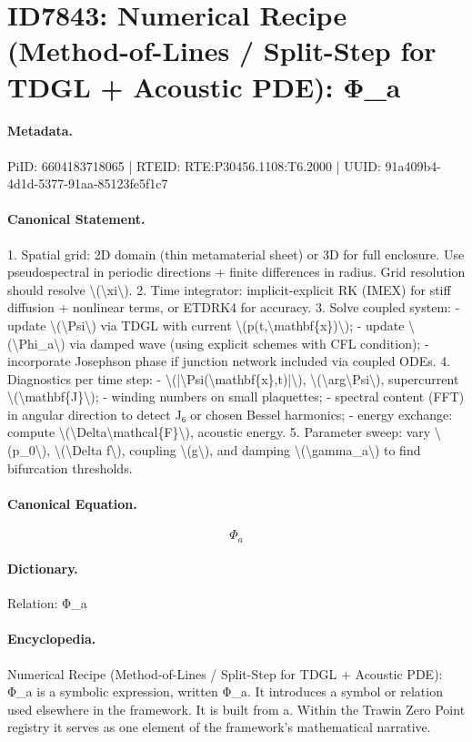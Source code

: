 \section*{ID7843: Numerical Recipe (Method-of-Lines / Split-Step for TDGL + Acoustic PDE): Φ\_a}
\paragraph{Metadata.}
PiID: 6604183718065 | RTEID: RTE:P30456.1108:T6.2000 | UUID: 91a409b4-4d1d-5377-91aa-85123fe5f1c7

\paragraph{Canonical Statement.}
1. Spatial grid: 2D domain (thin metamaterial sheet) or 3D for full enclosure. Use pseudospectral in periodic directions + finite differences in radius. Grid resolution should resolve \textbackslash{}(\textbackslash{}xi\textbackslash{}). 2. Time integrator: implicit-explicit RK (IMEX) for stiff diffusion + nonlinear terms, or ETDRK4 for accuracy. 3. Solve coupled system: - update \textbackslash{}(\textbackslash{}Psi\textbackslash{}) via TDGL with current \textbackslash{}(p(t,\textbackslash{}mathbf\{x\})\textbackslash{}); - update \textbackslash{}(\textbackslash{}Phi\_a\textbackslash{}) via damped wave (using explicit schemes with CFL condition); - incorporate Josephson phase if junction network included via coupled ODEs. 4. Diagnostics per time step: - \textbackslash{}(|\textbackslash{}Psi(\textbackslash{}mathbf\{x\},t)|\textbackslash{}), \textbackslash{}(\textbackslash{}arg\textbackslash{}Psi\textbackslash{}), supercurrent \textbackslash{}(\textbackslash{}mathbf\{J\}\textbackslash{}); - winding numbers on small plaquettes; - spectral content (FFT) in angular direction to detect J₆ or chosen Bessel harmonics; - energy exchange: compute \textbackslash{}(\textbackslash{}Delta\textbackslash{}mathcal\{F\}\textbackslash{}), acoustic energy. 5. Parameter sweep: vary \textbackslash{}(p\_0\textbackslash{}), \textbackslash{}(\textbackslash{}Delta f\textbackslash{}), coupling \textbackslash{}(g\textbackslash{}), and damping \textbackslash{}(\textbackslash{}gamma\_a\textbackslash{}) to find bifurcation thresholds.

\paragraph{Canonical Equation.}
\[
\Phi_a
\]

\paragraph{Dictionary.}
Relation: Φ\_a

\paragraph{Encyclopedia.}
Numerical Recipe (Method-of-Lines / Split-Step for TDGL + Acoustic PDE): Φ\_a is a symbolic expression, written Φ\_a. It introduces a symbol or relation used elsewhere in the framework. It is built from a. Within the Trawin Zero Point registry it serves as one element of the framework's mathematical narrative.
